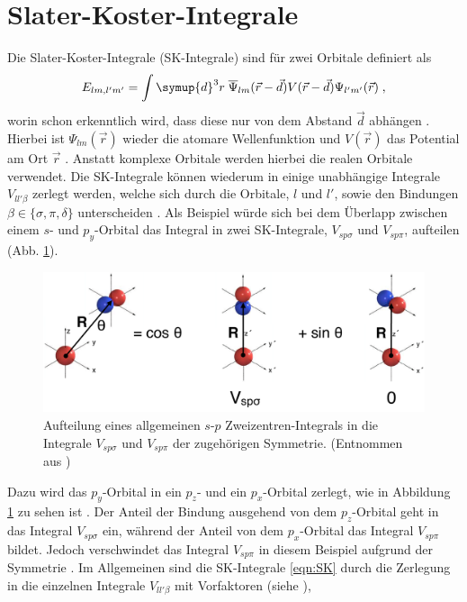 \section{Slater-Koster-Integrale}
Die Slater-Koster-Integrale (SK-Integrale) sind für zwei Orbitale definiert als
\begin{equation}
    E_{lm,l'm'} = \int \symup{d}^3r \; \overline{\Psi}_{lm} (\vec{r}-\vec{d})
    V(\vec{r} - \vec{d}) \Psi_{l'm'} (\vec{r}) \; , \label{eqn:SK}
\end{equation}
worin schon erkenntlich wird, dass diese nur von dem Abstand $\vec{d}$ abhängen \cite{SC_literature}.
Hierbei ist $\Psi_{lm}(\vec{r})$ wieder die atomare Wellenfunktion und $V(\vec{r})$ das Potential am Ort $\vec{r}$ \cite{SC_literature}.
Anstatt komplexe Orbitale werden hierbei die realen Orbitale verwendet.
Die SK-Integrale können wiederum in einige unabhängige Integrale $V_{ll'\beta}$ zerlegt werden, welche sich durch die Orbitale, $l$ und $l'$, 
sowie den Bindungen $\beta \in \{\sigma ,\pi, \delta \}$ unterscheiden \cite{electronic_structure}.
Als Beispiel würde sich bei dem Überlapp zwischen einem $s$- und $p_y$-Orbital das Integral in zwei 
SK-Integrale, $V_{sp\sigma}$ und $V_{sp\pi}$, aufteilen (Abb. \ref{fig:TC}).
\begin{figure}
    \centering
    \includegraphics[width = \textwidth]{Plots/tc.png}
    \caption{Aufteilung eines allgemeinen $s$-$p$ Zweizentren-Integrals in die Integrale $V_{sp\sigma}$ und $V_{sp\pi}$ der zugehörigen Symmetrie.
    (Entnommen aus \cite{SC_literature})}
    \label{fig:TC}
\end{figure}
Dazu wird das $p_y$-Orbital in ein $p_z$- und ein $p_x$-Orbital zerlegt, wie in Abbildung \ref{fig:TC} zu sehen ist \cite{SC_literature}\cite{electronic_structure}.
Der Anteil der Bindung ausgehend von dem $p_z$-Orbital geht in das Integral $V_{sp\sigma}$ ein, während 
der Anteil von dem $p_x$-Orbital das Integral $V_{sp\pi}$ bildet.
Jedoch verschwindet das Integral $V_{sp\pi}$ in diesem Beispiel aufgrund der Symmetrie \cite{SC_literature}.
Im Allgemeinen sind die SK-Integrale \eqref{eqn:SK} durch die Zerlegung in die einzelnen Integrale $V_{ll'\beta}$ mit Vorfaktoren (siehe \cite{PhysRev.94.1498}),
